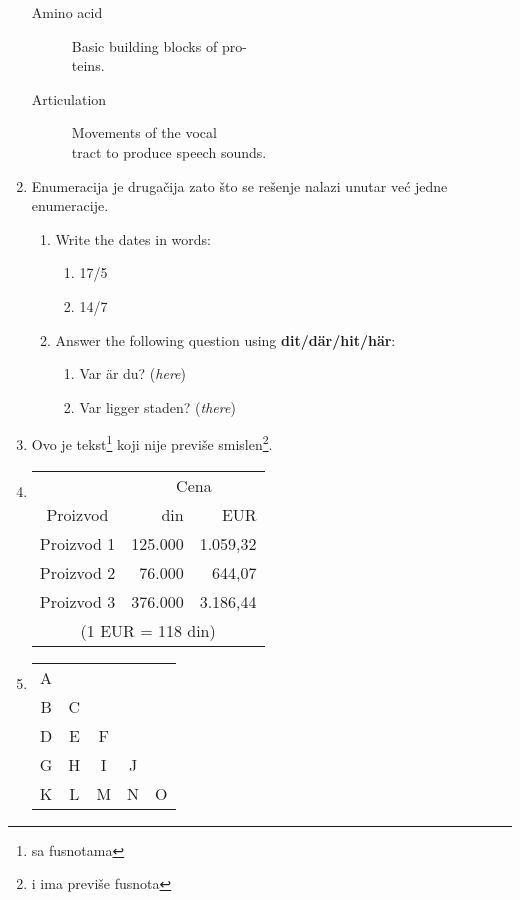 \documentclass[11pt]{article}
\begin{document}
\begin{enumerate}
\begin{description}
				\item[Amino acid] Basic building blocks of pro-\\teins.
				\item[Articulation] Movements of the vocal\\tract to produce speech sounds.
			\end{description}
		\item
			Enumeracija je druga\v cija zato \v sto se re\v senje nalazi unutar ve\' c jedne enumeracije.
			\begin{enumerate}
				\item Write the dates in words:
					\begin{enumerate}
						\item 17/5
						\item 14/7
					\end{enumerate}
				\item Answer the following question using \textbf{dit/d\" ar/hit/h\" ar}:
					\begin{enumerate}
						\item Var \" ar du? (\emph{here})
						\item Var ligger staden? (\emph{there})
					\end{enumerate}
			\end{enumerate}
		\item
			Ovo je tekst\footnote[1]{sa fusnotama} koji nije previ\v se smislen\footnote[2]{i ima previ\v se fusnota}.
		\item
			\begin{tabular}{|c|c@{,00 }|c|}
				\hline
				& \multicolumn{2}{|c|}{Cena} \\
				\cline{2-3}
				Proizvod & \multicolumn{1}{|r|}{din} & \multicolumn{1}{|r|}{EUR} \\
				\hline
				Proizvod 1 & \multicolumn{1}{|r|}{125.000} & \multicolumn{1}{|r|}{1.059,32} \\
				Proizvod 2 & \multicolumn{1}{|r|}{76.000} & \multicolumn{1}{|r|}{644,07} \\
				Proizvod 3 & \multicolumn{1}{|r|}{376.000} & \multicolumn{1}{|r|}{3.186,44} \\
				\hline
				\hline
				\multicolumn{3}{|c|}{(1 EUR = 118 din)} \\
				\hline
			\end{tabular}
		\item
			\begin{tabular}{|ccccc|}
				\cline{1-1}
				A & \multicolumn{4}{|c}{} \\ \cline{2-2}
				B & C & \multicolumn{3}{|c}{} \\ \cline{3-3}
				D & E & F & \multicolumn{2}{|c}{} \\ \cline{4-4}
				G & H & I & J & \multicolumn{1}{|c}{} \\ \cline{5-5}
				K & L & M & N & O \\ \hline
			\end{tabular}
	\end{enumerate}
\end{document}

